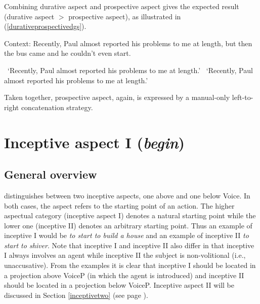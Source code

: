 \noindent Combining durative aspect and prospective aspect gives the expected result (durative aspect $>$ prospective aspect), as illustrated in (\ref{durativeprospectivedgs}).

\begin{exe}
\ex Context: Recently, Paul almost reported his problems to me at length, but then the bus came and he couldn't even start. \label{durativeprospectivedgs}\begin{xlist} 
\glt \textcolor{white}{*}`Recently, Paul almost reported his problems to me at length.' \label{ex:durativeprospectivedgsa}
\glt \textcolor{white}{*}`Recently, Paul almost reported his problems to me at length.' \label{ex:durativeprospectivedgsb}
\end{xlist}
\end{exe} 

\noindent Taken together, prospective aspect, again, is expressed by a manual-only left-to-right concatenation strategy.


\section{Inceptive aspect I (\textit{begin})}\label{inceptiveoneaaa}
\subsection{General overview}
\citet{cinque1999adverbs, cinque2006restructuring} distinguishes between two inceptive aspects, one above and one below Voice. In both cases, the aspect refers to the starting point of an action. The higher aspectual category (inceptive aspect I) denotes a natural starting point while the lower one (inceptive II) denotes an arbitrary starting point. Thus an example of inceptive I would be \textit{to start to build a house} and an example of inceptive II \textit{to start to shiver}. Note that inceptive I and inceptive II also differ in that inceptive I always involves an agent while inceptive II the subject is non-volitional (i.e., unaccusative). From the examples it is clear that inceptive I should be located in a projection above VoiceP (in which the agent is introduced) and inceptive II should be located in a projection below VoiceP. Inceptive aspect II will be discussed in Section \ref{inceptivetwo} (see page \pageref{inceptivetwo}).


